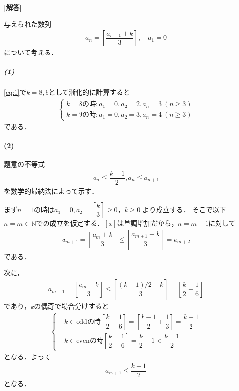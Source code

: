 \documentclass[../../main.tex]{subfiles}
\begin{document}
\begin{oframed}
  
\end{oframed}

{\bf [解答]}

与えられた数列
\begin{align}
  a_n=\left[\dfrac{a_{n-1}+k}{3}\right], \quad a_1=0 \label{eq:1}
\end{align}
について考える．

\subparagraph{(1)}

\cref{eq:1}で$k=8,9$として漸化的に計算すると
\begin{align}
  \begin{cases}
    k=8\text{の時}: a_1 = 0, a_2 = 2, a_n = 3 \ (n \ge 3) \\
    k=9\text{の時}: a_1 = 0, a_2 = 3, a_n = 4 \ (n \ge 3)
  \end{cases}
\end{align}
である．

\paragraph{(2)}

題意の不等式
\begin{align}
  a_n\leqq\dfrac{k-1}{2}, a_n \leqq a_{n+1} \label{eq:2}
\end{align}
を数学的帰納法によって示す．

まず$n=1$の時は$a_1=0, a_2 = [\dfrac{k}{3}] \ge 0$，$k \ge 0$ より成立する．
そこで以下$n=m \in \mathbb{N}$での成立を仮定する．$[x]$は単調増加だから，$n=m+1$に対して
\begin{align}
  a_{m+1}
  = \left[ \dfrac{a_m + k}{3} \right]
  \le \left[ \dfrac{a_{m+1} + k}{3} \right]
  = a_{m+2} \label{eq:3}
\end{align}
である．

次に，
\begin{align}
  a_{m+1}
  = \left[ \dfrac{a_m + k}{3} \right]
  \le \left[\dfrac{(k-1)/2+k}{3}\right]
  = \left[ \dfrac{k}{2} - \dfrac{1}{6} \right] \label{eq:4}
\end{align}
であり，$k$の偶奇で場合分けすると
\begin{align}
  \begin{cases}
    & k \in \text{odd} \text{の時} \left[ \dfrac{k}{2} - \dfrac{1}{6} \right] = \left[ \dfrac{k-1}{2} + \dfrac{1}{3} \right] = \dfrac{k-1}{2} \\
    & k \in \text{even}\text{の時} \left[ \dfrac{k}{2} - \dfrac{1}{6} \right] = \dfrac{k}{2} - 1 < \dfrac{k-1}{2}
  \end{cases}
\end{align}
となる．よって
\begin{align}
  a_{m+1} \le \dfrac{k-1}{2}
\end{align}
となる．
\end{document}
